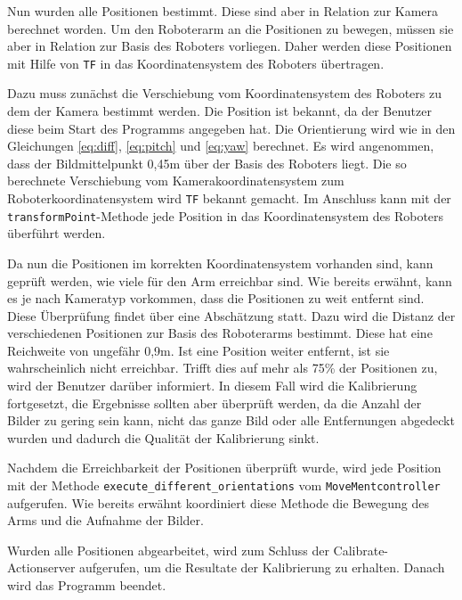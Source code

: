 Nun wurden alle Positionen bestimmt. Diese sind aber in Relation zur Kamera berechnet worden. Um den Roboterarm an die Positionen zu bewegen, müssen sie aber in Relation zur Basis des Roboters vorliegen. Daher werden diese Positionen mit Hilfe von \texttt{TF} in das Koordinatensystem des Roboters übertragen.

Dazu muss zunächst die Verschiebung vom Koordinatensystem des Roboters zu dem der Kamera bestimmt werden. Die Position ist bekannt, da der Benutzer diese beim Start des Programms angegeben hat. Die Orientierung wird wie in den Gleichungen \autoref{eq:diff}, \autoref{eq:pitch} und \autoref{eq:yaw} berechnet. Es wird angenommen, dass der Bildmittelpunkt 0,45m über der Basis des Roboters liegt. Die so berechnete Verschiebung vom Kamerakoordinatensystem zum Roboterkoordinatensystem wird \texttt{TF} bekannt gemacht. Im Anschluss kann mit der \texttt{transformPoint}-Methode jede Position in das Koordinatensystem des Roboters überführt werden.

Da nun die Positionen im korrekten Koordinatensystem vorhanden sind, kann geprüft werden, wie viele für den Arm erreichbar sind. Wie bereits erwähnt, kann es je nach Kameratyp vorkommen, dass die Positionen zu weit entfernt sind. Diese Überprüfung findet über eine Abschätzung statt. Dazu wird die Distanz der verschiedenen Positionen zur Basis des Roboterarms bestimmt. Diese hat eine Reichweite von ungefähr 0,9m. Ist eine Position weiter entfernt, ist sie wahrscheinlich nicht erreichbar. Trifft dies auf mehr als 75\% der Positionen zu, wird der Benutzer darüber informiert. In diesem Fall wird die Kalibrierung fortgesetzt, die Ergebnisse sollten aber überprüft werden, da die Anzahl der Bilder zu gering sein kann, nicht das ganze Bild oder alle Entfernungen abgedeckt wurden und dadurch die Qualität der Kalibrierung sinkt.

Nachdem die Erreichbarkeit der Positionen überprüft wurde, wird jede Position mit der Methode \texttt{execute\_different\_orientations} vom \texttt{MoveMentcontroller} aufgerufen. Wie bereits erwähnt koordiniert diese Methode die Bewegung des Arms und die Aufnahme der Bilder.

Wurden alle Positionen abgearbeitet, wird zum Schluss der Calibrate-Actionserver aufgerufen, um die Resultate der Kalibrierung zu erhalten. Danach wird das Programm beendet. 